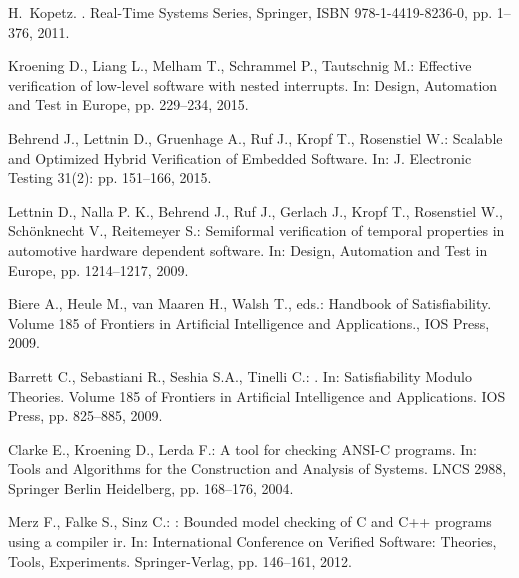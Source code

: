 \documentclass{acm_sen_article}
\begin{document}





\begin{thebibliography}{1}

H.~Kopetz.
.
\newblock Real-Time Systems Series, Springer, ISBN 978-1-4419-8236-0, pp. 1--376, 2011.

Kroening D., Liang L., Melham T., Schrammel P., Tautschnig M.:
\newblock Effective verification of low-level software with nested interrupts. 
\newblock In: Design, Automation and Test in Europe, pp. 229--234, 2015.

Behrend J., Lettnin D., Gruenhage A., Ruf J., Kropf T., Rosenstiel W.:
\newblock Scalable and Optimized Hybrid Verification of Embedded Software. 
\newblock In: J. Electronic Testing 31(2): pp. 151--166, 2015.

Lettnin D., Nalla P. K., Behrend J., Ruf J., Gerlach J., Kropf T., Rosenstiel W., Schönknecht V., Reitemeyer S.:
\newblock Semiformal verification of temporal properties in automotive hardware dependent software. 
\newblock In: Design, Automation and Test in Europe, pp. 1214--1217, 2009.

Biere A., Heule M., van Maaren H., Walsh T., eds.:
\newblock Handbook of Satisfiability.
\newblock Volume 185 of Frontiers in Artificial Intelligence and Applications., {IOS} Press, 2009.


Barrett C., Sebastiani R., Seshia S.A., Tinelli C.:
.
\newblock In: Satisfiability Modulo Theories. Volume 185 of Frontiers in
  Artificial Intelligence and Applications. IOS Press, pp. 825--885, 2009.

Clarke E., Kroening D., Lerda F.:
\newblock A tool for checking {ANSI-C} programs.
\newblock In: Tools and Algorithms for the Construction and Analysis of Systems. LNCS 2988, Springer Berlin Heidelberg,  pp. 168--176, 2004.

Merz F., Falke S., Sinz C.:
: Bounded model checking of {C} and {C++} programs using a
  compiler ir.
\newblock In: International Conference on Verified Software: Theories, Tools, Experiments. Springer-Verlag, pp. 146--161, 2012.


\end{thebibliography}
\end{document}
